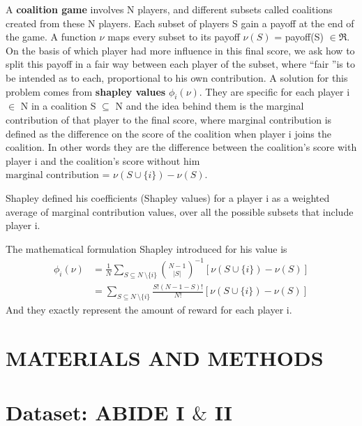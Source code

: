\documentclass[10pt]{report}
\begin{document}
A \textbf{coalition game} involves N players, and different subsets called coalitions created from these N players.
Each subset of players S gain a payoff at the end of the game.
A function $\nu$ maps every subset to its payoff $\nu(S)$ = payoff(S) $\in \Re$.
On the basis of which player had more influence in this final score, we ask how to split this payoff in a fair way between each player of the subset, where \textquotedblleft fair \textquotedblright is to be intended as to each, proportional to his own contribution.
A solution for this problem comes from \textbf{shapley values} $\phi_i(\nu)$.
They are specific for each player i $\in$ N in a coalition S $\subseteq$ N and the idea behind them is the marginal contribution of that player to the final score, where marginal contribution is defined as the difference on the score of the coalition when player i joins the coalition.
In other words they are the difference between the coalition's score with player i and the coalition's score without him $\text{marginal contribution = }\nu (S \cup \{ i \}) - \nu(S)$. \cite{algaba-2021}

Shapley defined his coefficients (Shapley values) for a player i as a weighted average of marginal contribution values, over all the possible subsets that include player i.

The mathematical formulation Shapley introduced for his value is
\begin{equation}
\begin{aligned}
\phi_i(\nu)  & = \frac{1}{N }\sum_{S\subseteq N\ \setminus \{ i \} }  {N- 1 \choose |S|}^{-1} [\nu (S \cup \{ i \}) - \nu(S)] \\
& = \sum_{S\subseteq N\ \setminus \{ i \} }  \frac{S! (N-1-S)!}{N!} [\nu (S \cup \{ i \}) - \nu(S) ]
\end{aligned}
\end{equation}
And they exactly represent the amount of reward for each player i.



\chapter*{MATERIALS AND METHODS}

\chapter{Dataset: ABIDE I $\&$ II}
\end{document}
